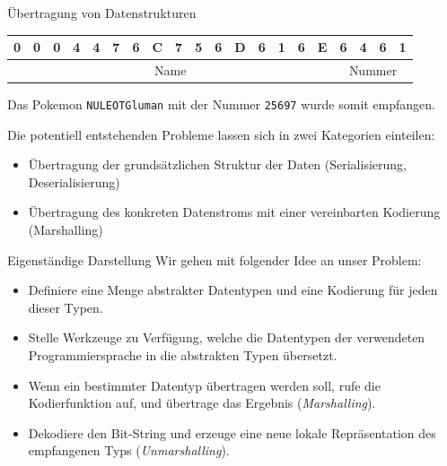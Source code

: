 \begin{example}{Übertragung von Datenstrukturen}
    \begin{center}
        \begin{tabular}{|c|c|c|c|c|c|c|c|c|c|c|c|c|c|c|c|c|c|c|c|}
            \hline
            0                          & 0                            & 0 & 4 & 4 & 7 & 6 & C & 7 & 5 & 6 & D & 6 & 1 & 6 & E & 6 & 4 & 6 & 1 \\\hline
            \multicolumn{16}{|c}{Name} & \multicolumn{4}{|c|}{Nummer}                                                                         \\\hline
        \end{tabular}
    \end{center}

    Das Pokemon \texttt{NULEOTGluman} mit der Nummer \texttt{25697} wurde somit empfangen.

    Die potentiell entstehenden Probleme lassen sich in zwei Kategorien einteilen:

    \begin{itemize}
        \item Übertragung der grundsätzlichen Struktur der Daten (Serialisierung, Deserialisierung)
        \item Übertragung des konkreten Datenstroms mit einer vereinbarten Kodierung (Marshalling)
    \end{itemize}
\end{example}

\begin{bonus}{Eigenständige Darstellung}
    Wir gehen mit folgender Idee an unser Problem:

    \begin{itemize}
        \item Definiere eine Menge abstrakter Datentypen und eine Kodierung für jeden dieser Typen.
        \item Stelle Werkzeuge zu Verfügung, welche die Datentypen der verwendeten Programmiersprache in die abstrakten Typen übersetzt.
        \item Wenn ein bestimmter Datentyp übertragen werden soll, rufe die Kodierfunktion auf, und übertrage das Ergebnis (\emph{Marshalling}).
        \item Dekodiere den Bit-String und erzeuge eine neue lokale Repräsentation des empfangenen Typs (\emph{Unmarshalling}).
    \end{itemize}
\end{bonus}

